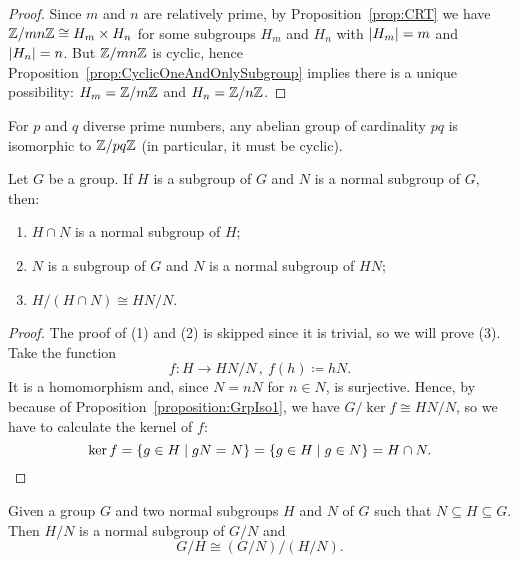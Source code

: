 \begin{proof}
Since \(m\) and \(n\) are relatively prime, by Proposition~\ref{prop:CRT} we have \(\mathbb Z/mn\mathbb Z \cong H_m \times H_n\) for some subgroups \(H_m\) and \(H_n\) with \(\left\lvert H_m\right\rvert = m\) and \(\left\lvert H_n\right\rvert = n\). But \(\mathbb Z/mn\mathbb Z\) is cyclic, hence Proposition~\ref{prop:CyclicOneAndOnlySubgroup} implies there is a unique possibility: \(H_m = \mathbb Z/m\mathbb Z\) and \(H_n = \mathbb Z/n\mathbb Z\).
\end{proof}

\begin{exercise}
For \(p\) and \(q\) diverse prime numbers, any abelian group of cardinality \(pq\) is isomorphic to \(\mathbb Z/pq\mathbb Z\) (in particular, it must be cyclic).
\end{exercise}

\begin{proposition}
Let \(G\) be a group. If \(H\) is a subgroup of \(G\) and \(N\) is a normal subgroup of \(G\), then:
\begin{enumerate}
\item \(H \cap N\) is a normal subgroup of \(H\);
\item \(N\) is a subgroup of \(G\) and \(N\) is a normal subgroup of \(HN\);
\item \(H/(H \cap N) \cong HN/N\).
\end{enumerate}
\end{proposition}

\begin{proof}
The proof of (1) and (2) is skipped since it is trivial, so we will prove (3). Take the function
\[f : H \to HN/N\,, \ f(h) \coloneq hN .\]
It is a homomorphism and, since \(N = nN\) for \(n \in N\), is surjective.
Hence, by because of Proposition~\ref{proposition:GrpIso1}, we have \(G/\ker f \cong HN/N\), so we have to calculate the kernel of \(f\):
\[\ker f = \left\{g \in H \mid gN = N\right\} = \left\{g \in H \mid g \in N\right\} = H \cap N .\qedhere\]
\end{proof}

\begin{proposition}
Given a group \(G\) and two normal subgroups \(H\) and \(N\) of \(G\) such that \(N \subseteq H \subseteq G\). Then \(H/N\) is a normal subgroup of \(G/N\) and
\[G/H \cong (G/N)/(H/N) .\]
\end{proposition}

